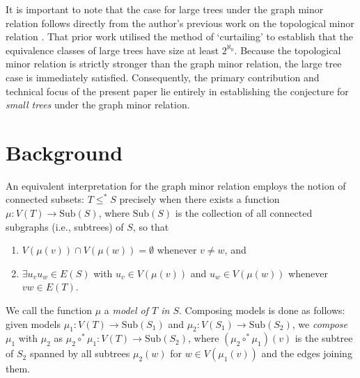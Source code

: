 \documentclass[12pt]{amsart}
\numberwithin{mytheorem}{section} %
\numberwithin{mylemma}{section} %
\numberwithin{mycorollary}{section} %
\begin{document}
It is important to note that the case for large trees under the graph minor relation follows directly from the author's previous work on the topological minor relation \cite{BP1}. That prior work utilised the method of `curtailing' to establish that the equivalence classes of large trees have size at least $2^{\aleph_0}$. Because the topological minor relation is strictly stronger than the graph minor relation, the large tree case is immediately satisfied. Consequently, the primary contribution and technical focus of the present paper lie entirely in establishing the conjecture for {\it small trees} under the graph minor relation. \section{Background}

An equivalent interpretation for the graph minor relation employs the notion of connected subsets: $T \leq^* S$ precisely when there exists a function $\mu: V(T) \to \text{Sub}(S)$, where $\text{Sub}(S)$ is the collection of all connected subgraphs (i.e., subtrees) of $S$, so that 
\begin{enumerate}
\item $V(\mu(v)) \cap V(\mu(w)) = \emptyset$ whenever $v\not = w$, and
\medskip
\item $\exists u_vu_w\in E(S)$ with $u_v \in V(\mu(v))$ and $u_w\in V(\mu(w))$ whenever $vw \in E(T)$.
\end{enumerate}
We call the function $\mu$ a {\it model of $T$ in $S$}. Composing models is done as follows: given models $\mu_1: V(T) \to \text{Sub}(S_1)$ and $\mu_2:V(S_1) \to \text{Sub}(S_2)$, we {\it compose} $\mu_1$ with $\mu_2$ as $\mu_2\circ^*\mu_1: V(T) \to \text{Sub}(S_2)$, where $(\mu_2\circ^*\mu_1)(v)$ is the subtree of $S_2$ spanned by all subtrees $\mu_2(w)$ for $w\in V(\mu_1(v))$ and the edges joining them.
\end{document}
